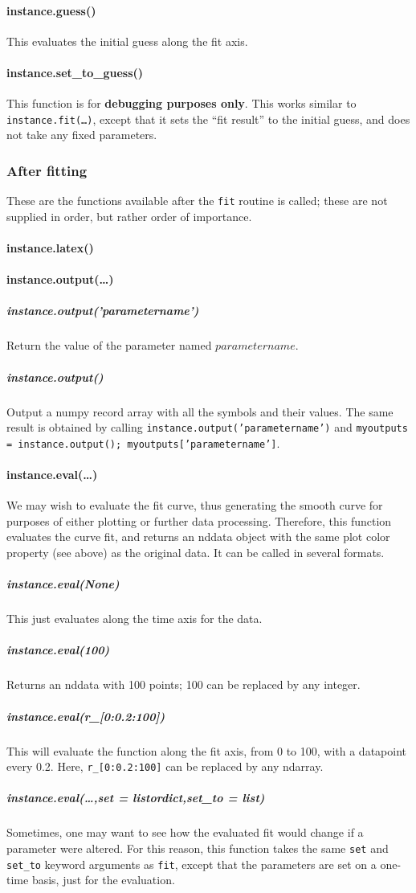 \paragraph{instance.guess()}
This evaluates the initial guess along the fit axis.
\paragraph{instance.set_to_guess()}
This function is for {\bf debugging purposes only}.
This works similar to {\tt instance.fit(\ldots)},
    except that it sets the ``fit result'' to the initial guess,
    and does not take any fixed parameters.
\subsubsection{After fitting}
These are the functions available after the {\tt fit}
    routine is called; these are not supplied in order,
    but rather order of importance.
\paragraph{instance.latex()}
\paragraph{instance.output(\ldots)}
\subparagraph{instance.output('parametername')}
Return the value of the parameter named
    $parametername$.
\subparagraph{instance.output()}
Output a numpy record array with all the symbols and their values.
The same result is obtained by calling
    \texttt{instance.output('parametername')}
    and
    \texttt{myoutputs = instance.output();
    myoutputs['parametername']}.
\paragraph{instance.eval(\ldots)}
We may wish to evaluate the fit curve,
    thus generating the smooth curve
    for purposes of either plotting or further
    data processing.
Therefore, this function evaluates the curve fit, and returns
    an nddata object with the same plot color property (see above)
    as the original data.
It can be called in several formats.
\subparagraph{instance.eval(None)}
This just evaluates along the time axis for the data.
\subparagraph{instance.eval(100)}
Returns an nddata with 100 points;
    100 can be replaced by any integer.
\subparagraph{instance.eval(r\_[0:0.2:100])}
This will evaluate the function along the
    fit axis, from 0 to 100, with a datapoint every 0.2.
Here, {\tt r\_[0:0.2:100]} can be replaced 
    by any ndarray.
\subparagraph{instance.eval(\ldots,set = listordict,set\_to = list)}
Sometimes, one may want to see how the evaluated
    fit would change if a parameter were altered.
For this reason, this function takes the same {\tt set} and {\tt set\_to}
    keyword arguments as {\tt fit}, except that the
    parameters are set on a one-time basis, just for the evaluation.
